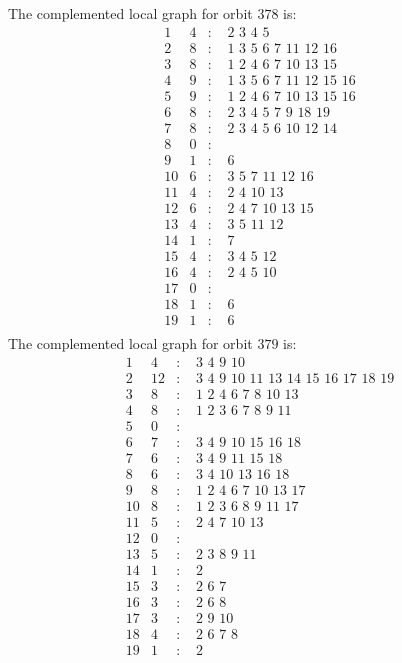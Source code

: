 \documentclass[12pt]{article}
\begin{document}
The complemented local graph for orbit $378$ is:
\begin{equation*}
\begin{array}{rrcl}
1&4&:&\,\,2\,\,3\,\,4\,\,5\\
2&8&:&\,\,1\,\,3\,\,5\,\,6\,\,7\,\,11\,\,12\,\,16\\
3&8&:&\,\,1\,\,2\,\,4\,\,6\,\,7\,\,10\,\,13\,\,15\\
4&9&:&\,\,1\,\,3\,\,5\,\,6\,\,7\,\,11\,\,12\,\,15\,\,16\\
5&9&:&\,\,1\,\,2\,\,4\,\,6\,\,7\,\,10\,\,13\,\,15\,\,16\\
6&8&:&\,\,2\,\,3\,\,4\,\,5\,\,7\,\,9\,\,18\,\,19\\
7&8&:&\,\,2\,\,3\,\,4\,\,5\,\,6\,\,10\,\,12\,\,14\\
8&0&:&\\
9&1&:&\,\,6\\
10&6&:&\,\,3\,\,5\,\,7\,\,11\,\,12\,\,16\\
11&4&:&\,\,2\,\,4\,\,10\,\,13\\
12&6&:&\,\,2\,\,4\,\,7\,\,10\,\,13\,\,15\\
13&4&:&\,\,3\,\,5\,\,11\,\,12\\
14&1&:&\,\,7\\
15&4&:&\,\,3\,\,4\,\,5\,\,12\\
16&4&:&\,\,2\,\,4\,\,5\,\,10\\
17&0&:&\\
18&1&:&\,\,6\\
19&1&:&\,\,6\\
\end{array}
\end{equation*}
The complemented local graph for orbit $379$ is:
\begin{equation*}
\begin{array}{rrcl}
1&4&:&\,\,3\,\,4\,\,9\,\,10\\
2&12&:&\,\,3\,\,4\,\,9\,\,10\,\,11\,\,13\,\,14\,\,15\,\,16\,\,17\,\,18\,\,19\\
3&8&:&\,\,1\,\,2\,\,4\,\,6\,\,7\,\,8\,\,10\,\,13\\
4&8&:&\,\,1\,\,2\,\,3\,\,6\,\,7\,\,8\,\,9\,\,11\\
5&0&:&\\
6&7&:&\,\,3\,\,4\,\,9\,\,10\,\,15\,\,16\,\,18\\
7&6&:&\,\,3\,\,4\,\,9\,\,11\,\,15\,\,18\\
8&6&:&\,\,3\,\,4\,\,10\,\,13\,\,16\,\,18\\
9&8&:&\,\,1\,\,2\,\,4\,\,6\,\,7\,\,10\,\,13\,\,17\\
10&8&:&\,\,1\,\,2\,\,3\,\,6\,\,8\,\,9\,\,11\,\,17\\
11&5&:&\,\,2\,\,4\,\,7\,\,10\,\,13\\
12&0&:&\\
13&5&:&\,\,2\,\,3\,\,8\,\,9\,\,11\\
14&1&:&\,\,2\\
15&3&:&\,\,2\,\,6\,\,7\\
16&3&:&\,\,2\,\,6\,\,8\\
17&3&:&\,\,2\,\,9\,\,10\\
18&4&:&\,\,2\,\,6\,\,7\,\,8\\
19&1&:&\,\,2\\
\end{array}
\end{equation*}
\end{document}
